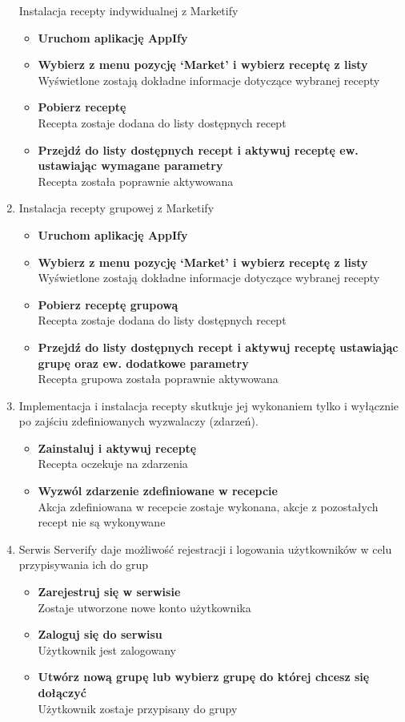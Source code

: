 \documentclass[11pt,a4paper,polish,thesis]{dcsbook}
\begin{document}
\begin{enumerate}
Instalacja recepty indywidualnej z Marketify
\begin{itemize}
\item \textbf{Uruchom aplikację AppIfy}\\
\item \textbf{Wybierz z menu pozycję ‘Market’ i wybierz receptę z listy}\\
Wyświetlone zostają dokładne informacje dotyczące wybranej recepty
\item \textbf{Pobierz receptę}\\
Recepta zostaje dodana do listy dostępnych recept
\item \textbf{Przejdź do listy dostępnych recept i aktywuj receptę ew. ustawiając wymagane parametry}\\
Recepta została poprawnie aktywowana
\end{itemize}
\item
Instalacja recepty grupowej z Marketify
\begin{itemize}
\item \textbf{Uruchom aplikację AppIfy}\\
\item \textbf{Wybierz z menu pozycję ‘Market’ i wybierz receptę z listy}\\
Wyświetlone zostają dokładne informacje dotyczące wybranej recepty
\item \textbf{Pobierz receptę grupową}\\
Recepta zostaje dodana do listy dostępnych recept
\item \textbf{Przejdź do listy dostępnych recept i aktywuj receptę ustawiając grupę oraz ew. dodatkowe parametry}\\
Recepta grupowa została poprawnie aktywowana
\end{itemize}
\item
Implementacja i instalacja recepty skutkuje jej wykonaniem tylko i wyłącznie po zajściu zdefiniowanych wyzwalaczy (zdarzeń).
\begin{itemize}
\item \textbf{Zainstaluj i aktywuj receptę}\\
Recepta oczekuje na zdarzenia
\item \textbf{Wyzwól zdarzenie zdefiniowane w recepcie}\\
Akcja zdefiniowana w recepcie zostaje wykonana, akcje z pozostałych recept nie są wykonywane
\end{itemize}
\item
Serwis Serverify daje możliwość rejestracji i logowania użytkowników w celu przypisywania ich do grup
\begin{itemize}
\item \textbf{Zarejestruj się w serwisie}\\
Zostaje utworzone nowe konto użytkownika
\item \textbf{Zaloguj się do serwisu}\\
Użytkownik jest zalogowany
\item \textbf{Utwórz nową grupę lub wybierz grupę do której chcesz się dołączyć}\\
Użytkownik zostaje przypisany do grupy
\end{itemize}
\end{enumerate}
\end{document}

